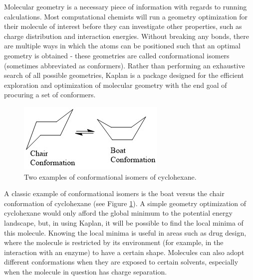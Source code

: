 \documentclass[12pt]{article}
\newcommand{\progname}{Kaplan} %
\begin{document}
Molecular geometry is a necessary piece of information with regards to running 
calculations. Most computational chemists will run a 
geometry optimization for 
their molecule of interest before they can investigate 
other properties, such as 
charge distribution and interaction energies. Without breaking any bonds, there 
are multiple ways in which the atoms can be positioned such that an optimal 
geometry is obtained - these geometries are called conformational isomers 
(sometimes abbreviated as conformers). Rather than 
performing an exhaustive 
search of all possible geometries, \progname{} is a 
package designed for the 
efficient exploration and optimization of molecular 
geometry with the end goal 
of procuring a set of conformers.


\begin{figure}[H]
	\begin{center}
	\includegraphics[]{C6H14}
	\end{center}
	\caption{Two examples of conformational isomers of cyclohexane.}
	\label{C6H14}
\end{figure}


A classic example of conformational isomers is the boat versus the chair 
conformation of cyclohexane (see Figure \ref{C6H14}). A simple geometry 
optimization of cyclohexane would only afford the 
global minimum to the 
potential energy landscape, but, in using \progname{}, it will be possible to 
find the local minima of this molecule. Knowing the 
local minima is useful in 
areas such as drug design, where the molecule is restricted by its environment 
(for example, in the interaction with an enzyme) to have a certain shape. 
Molecules can also adopt different conformations when they are exposed to 
certain solvents, especially when the molecule in question has charge 
separation.

\end{document}
